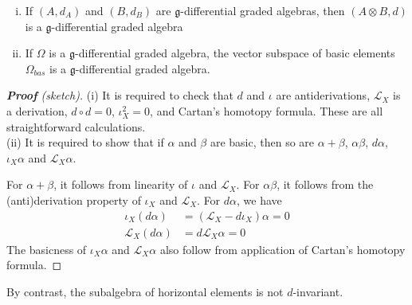 \begin{prop}  \label{prop:dga_operations}
	\phantom{}	%
	\begin{enumerate}[(i), leftmargin=\parindent]
	    \item 
			If $(A,d_A)$ and  $(B,d_B)$ are $\mathfrak{g}$-differential graded 
			algebras, then $(A\otimes B,d)$ is a $\mathfrak{g}$-differential graded 
			algebra
		\item 
	If $\Omega$ is a  $\mathfrak{g}$-differential graded algebra, the vector
	subspace of basic elements $\Omega_{bas}$ is a $\mathfrak{g}$-differential
	graded algebra.
	\end{enumerate}
\end{prop}
\begin{proof}[\textbf{\textit{Proof}} (sketch)]
	(i) It is required to check that $d$ and $\iota$ are antiderivations,
	$\mathcal{L}_X$ is a derivation, $d\circ d = 0$,  $\iota_X^2=0$, and
	Cartan's homotopy formula. These are all straightforward calculations.\\
	(ii) It is required to show that if $\alpha$ and  $\beta$ are basic, then so
	are $\alpha+\beta$,  $\alpha\beta$,  $d\alpha$,  $\iota_X \alpha$ and
	$\mathcal{L}_X\alpha $. 

	For $\alpha+\beta$, it follows from linearity of  $\iota$ and
	$\mathcal{L}_X$. For $\alpha\beta$, it follows from the (anti)derivation
	property of $\iota_X$ and  $\mathcal{L}_X$. For $d\alpha$, we have 
	 \begin{align*}
		 \iota_X(d\alpha) &= (\mathcal{L}_X-d\iota_X)\alpha = 0 \tag{by Cartan's
		 homotopy formula} \\
			 \mathcal{L}_X(d\alpha) &= d\mathcal{L}_X \alpha = 0 
		\tag{again by Cartan's homotopy formula}
	 \end{align*} 
	The basicness of $\iota_X\alpha$ and  $\mathcal{L}_X\alpha$ also follow 
	from application of Cartan's homotopy formula.
\end{proof}
By contrast, the subalgebra of horizontal elements is not
$d$-invariant.

